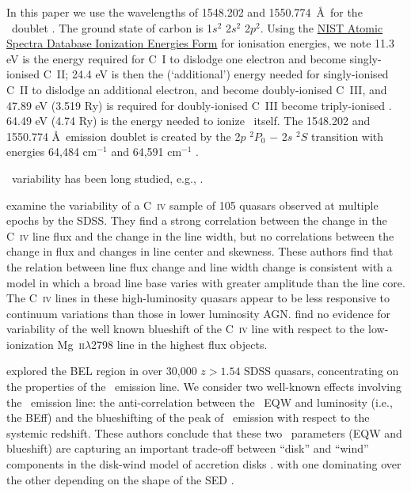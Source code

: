 \documentclass[a4paper,fleqn,usenatbib]{mnras}
\begin{document}
In this paper we use the wavelengths of 1548.202 and 1550.774~\AA\ for
the \civ\ doublet \citep{Kramida2018}. The ground state of carbon is
1$s^2$ 2$s^2$ 2$p^2$.  Using the
\href{https://physics.nist.gov/PhysRefData/ASD/ionEnergy.html}{NIST
Atomic Spectra Database Ionization Energies Form} for ionisation
energies, we note 11.3 eV is the energy required for C~I to dislodge
one electron and become singly-ionised C~II; 24.4 eV is then the
(`additional') energy needed for singly-ionised C~II to dislodge an
additional electron, and become doubly-ionised C~III, and 47.89 eV
(3.519 Ry) is required for doubly-ionised C~III become triply-ionised
\civ.  64.49 eV (4.74 Ry) is the energy needed to ionize \civ\
itself. The 1548.202 and 1550.774 \AA\ emission doublet is created by
the 2$p$ $^{2}P_{0}$ $-$ 2$s$ $^{2}S$ transition with energies 64,484
cm$^{-1}$ and 64,591 cm$^{-1}$ \citep[e.g.][]{Moore1993}.
 
\civ\ variability has been long studied, e.g., \citet[][]{Baldwin1977,
Gaskell1982, Gregory1982, Wilkes1986, Espey1989, Espey1990Erratum,
ZhengSulentic1990, Corbin1990, Corbin1991, Weymann1991,
Dimitrijevic1992, TytlerFan1992, Wills1993, Brotherton1994, Osmer1994,
Laor1995, McIntosh1999, Nazarova2003}.  

\citet{Wilhite2006} examine
the variability of a C~\textsc{iv} sample of 105 quasars observed at
multiple epochs by the SDSS.  They find a strong correlation between
the change in the C~\textsc{iv} line flux and the change in the line
width, but no correlations between the change in flux and changes in
line center and skewness.  These authors find that the relation
between line flux change and line width change is consistent with a
model in which a broad line base varies with greater amplitude than
the line core. The C~\textsc{iv} lines in these high-luminosity
quasars appear to be less responsive to continuum variations than
those in lower luminosity AGN.  \citet{Wilhite2006} find no evidence
for variability of the well known blueshift of the C~\textsc{iv} line
with respect to the low-ionization Mg~\textsc{ii}$\lambda$2798 line in
the highest flux objects.

\citet{Richards2011} explored the BEL region in over 30,000 $z > 1.54$ SDSS
quasars, concentrating on the properties of the \civ\ emission
line. We consider two well-known effects involving the \civ\ emission
line: the anti-correlation between the \civ\ EQW and luminosity (i.e.,
the BEff) and the blueshifting of the peak of \civ\ emission with
respect to the systemic redshift. These authors conclude that these
two \civ\ parameters (EQW and blueshift) are capturing an important
trade-off between ``disk'' and ``wind'' components in the disk-wind
model of accretion disks \citep[e.g.,][]{Murray1995, Elvis2000,
Proga2000}.  with one dominating over the other depending on the shape
of the SED \citep[][strong \civ\ EQW indicates a more ionizing SED and
large \civ\ blueshift indicating a less ionizing SED]{Leighly2004b}.
\end{document}
